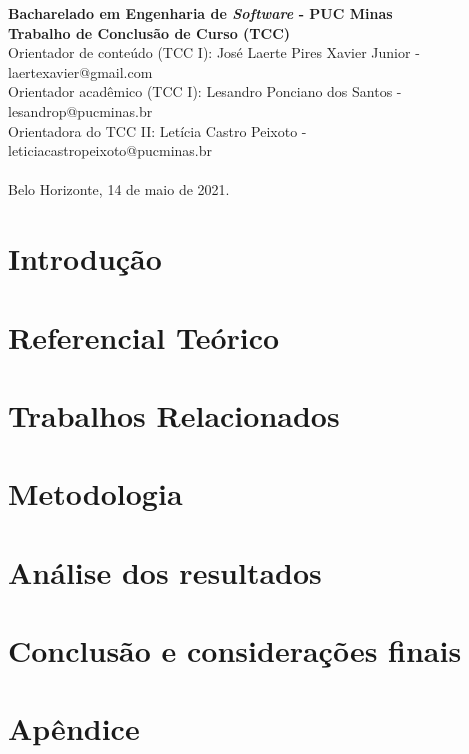 \documentclass[12pt]{article}
\begin{document}
\begin{tcolorbox}
\footnotesize
\textbf{Bacharelado em Engenharia de \emph{Software} - PUC Minas\\
Trabalho de Conclusão de Curso (TCC)} \\

\indent Orientador de conteúdo (TCC I): José Laerte Pires Xavier Junior - laertexavier@gmail.com\\
Orientador acadêmico (TCC I): Lesandro Ponciano dos Santos - lesandrop@pucminas.br\\
Orientadora do TCC II: Letícia Castro Peixoto - leticiacastropeixoto@pucminas.br\\ \\
Belo Horizonte, 14 de maio de 2021.
\end{tcolorbox}

\newpage

\section{Introdução}



\section{Referencial Teórico}



\section{Trabalhos Relacionados}



\section{Metodologia}



\section{Análise dos resultados}



\section{Conclusão e considerações finais}



\section*{Apêndice}





\end{document}
